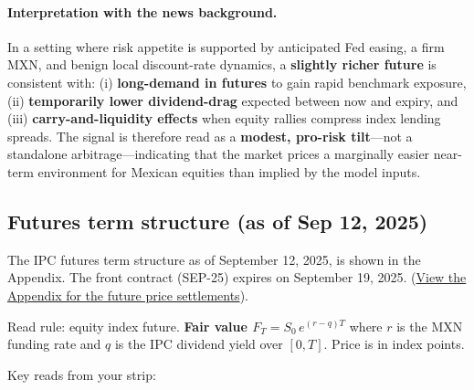 \documentclass[10pt,a4paper]{article} %
\begin{document}
\paragraph{Interpretation with the news background.} In a setting where risk appetite is supported by anticipated Fed easing, a firm MXN, and benign local discount-rate dynamics, a \textbf{slightly richer future} is consistent with: (i) \textbf{long-demand in futures} to gain rapid benchmark exposure, (ii) \textbf{temporarily lower dividend-drag} expected between now and expiry, and (iii) \textbf{carry-and-liquidity effects} when equity rallies compress index lending spreads. The signal is therefore read as a \textbf{modest, pro-risk tilt}—not a standalone arbitrage—indicating that the market prices a marginally easier near-term environment for Mexican equities than implied by the model inputs.

\subsection{Futures term structure (as of Sep 12, 2025)}

The IPC futures term structure as of September 12, 2025, is shown in the Appendix. The front contract (SEP-25) expires on September 19, 2025. (\hyperref[fig:ipc_settlements]{View the Appendix for the future price settlements}).

Read rule: equity index future. \textbf{Fair value $F_T = S_0\,e^{(r-q)T}$} where $r$ is the MXN funding rate and $q$ is the IPC dividend yield over $[0,T]$. Price is in index points.

Key reads from your strip:
\end{document}
